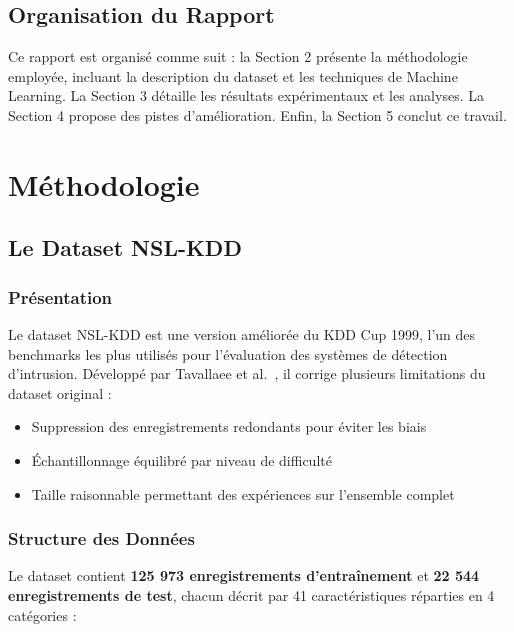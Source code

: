 \documentclass[12pt,a4paper]{article}
\begin{document}
\subsection{Organisation du Rapport}

Ce rapport est organisé comme suit : la Section 2 présente la méthodologie employée, incluant la description du dataset et les techniques de Machine Learning. La Section 3 détaille les résultats expérimentaux et les analyses. La Section 4 propose des pistes d'amélioration. Enfin, la Section 5 conclut ce travail.

\section{Méthodologie}

\subsection{Le Dataset NSL-KDD}

\subsubsection{Présentation}

Le dataset NSL-KDD est une version améliorée du KDD Cup 1999, l'un des benchmarks les plus utilisés pour l'évaluation des systèmes de détection d'intrusion. Développé par Tavallaee et al.~\cite{tavallaee2009}, il corrige plusieurs limitations du dataset original :

\begin{itemize}
    \item Suppression des enregistrements redondants pour éviter les biais
    \item Échantillonnage équilibré par niveau de difficulté
    \item Taille raisonnable permettant des expériences sur l'ensemble complet
\end{itemize}

\subsubsection{Structure des Données}

Le dataset contient \textbf{125 973 enregistrements d'entraînement} et \textbf{22 544 enregistrements de test}, chacun décrit par 41 caractéristiques réparties en 4 catégories :
\end{document}
